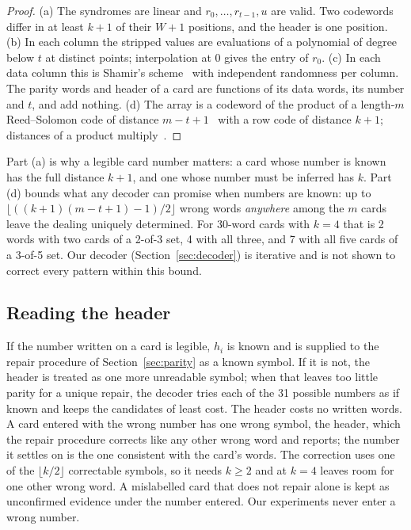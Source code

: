 \documentclass[numeric]{anvil-paper}
\begin{document}
\begin{proof}
(a) The syndromes are linear and $r_0,\dots,r_{t-1},u$ are valid. Two codewords
differ in at least $k+1$ of their $W+1$ positions, and the header is one
position.
(b) In each column the stripped values are evaluations of a polynomial of
degree below $t$ at distinct points; interpolation at $0$ gives the entry of
$r_0$.
(c) In each data column this is Shamir's scheme~\citep{shamir1979how} with
independent randomness per column. The parity words and header of a card are
functions of its data words, its number and $t$, and add nothing.
(d) The array is a codeword of the product of a length-$m$ Reed--Solomon code
of distance $m-t+1$~\citep{mceliece1981sharing} with a row code of distance
$k+1$; distances of a product multiply~\citep{elias1954error}.
\end{proof}

Part (a) is why a legible card number matters: a card whose number is known has
the full distance $k+1$, and one whose number must be inferred has $k$. Part
(d) bounds what any decoder can promise when numbers are known: up to
$\lfloor((k+1)(m-t+1)-1)/2\rfloor$ wrong words \emph{anywhere} among the $m$
cards leave the dealing uniquely determined. For 30-word cards with $k=4$ that
is 2 words with two cards of a 2-of-3 set, 4 with all three, and 7 with all
five cards of a 3-of-5 set. Our decoder (Section~\ref{sec:decoder}) is
iterative and is not shown to correct every pattern within this bound.

\subsection{Reading the header}

If the number written on a card is legible, $h_i$ is known and is supplied to
the repair procedure of Section~\ref{sec:parity} as a known symbol. If it is not, the header is treated as one
more unreadable symbol; when that leaves too little parity for a unique
repair, the decoder tries each of the 31 possible numbers as if known and keeps
the candidates of least cost. The header costs no written words. A card entered with the wrong number has
one wrong symbol, the header, which the repair procedure corrects like any
other wrong word and reports; the number it settles on is the one consistent
with the card's words. The correction uses one of the $\lfloor k/2\rfloor$
correctable symbols, so it needs $k\ge2$ and at $k=4$ leaves room for one
other wrong word. A mislabelled card that does not repair alone is kept as
unconfirmed evidence under the number entered. Our experiments never enter a
wrong number.
\end{document}
